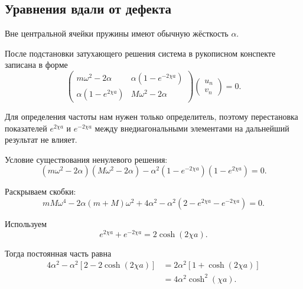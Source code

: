 \documentclass[../final.tex]{subfiles}
\begin{document}
\subsection*{Уравнения вдали от дефекта}

Вне центральной ячейки пружины имеют обычную жёсткость $\alpha$.

После подстановки затухающего решения
система в рукописном конспекте записана в форме
%
\begin{equation*}
    \begin{pmatrix}
        m\omega^2-2\alpha
        &
        \alpha(1-e^{-2\chi a})
        \\[2mm]
        \alpha(1-e^{2\chi a})
        &
        M\omega^2-2\alpha
    \end{pmatrix}
    \begin{pmatrix}
        u_n
        \\
        v_n
    \end{pmatrix}
    =
    0.
\end{equation*}
%

Для определения частоты нам нужен только определитель,
поэтому перестановка показателей
$e^{2\chi a}$ и $e^{-2\chi a}$
между внедиагональными элементами
на дальнейший результат не влияет.

Условие существования ненулевого решения:
%
\begin{equation*}
    \left(
        m\omega^2-2\alpha
    \right)
    \left(
        M\omega^2-2\alpha
    \right)
    -
    \alpha^2
    \left(
        1-e^{-2\chi a}
    \right)
    \left(
        1-e^{2\chi a}
    \right)
    =
    0.
\end{equation*}
%

Раскрываем скобки:
%
\begin{equation*}
    mM\omega^4
    -
    2\alpha(m+M)\omega^2
    +
    4\alpha^2
    -
    \alpha^2
    \left(
        2-e^{2\chi a}-e^{-2\chi a}
    \right)
    =
    0.
\end{equation*}
%

Используем
%
\begin{equation*}
    e^{2\chi a}+e^{-2\chi a}
    =
    2\cosh(2\chi a).
\end{equation*}
%

Тогда постоянная часть равна
%
\begin{align*}
    4\alpha^2
    -
    \alpha^2
    \left[
        2-2\cosh(2\chi a)
    \right]
    &=
    2\alpha^2
    \left[
        1+\cosh(2\chi a)
    \right]
    \\
    &=
    4\alpha^2
    \cosh^2(\chi a).
\end{align*}
%
\end{document}
